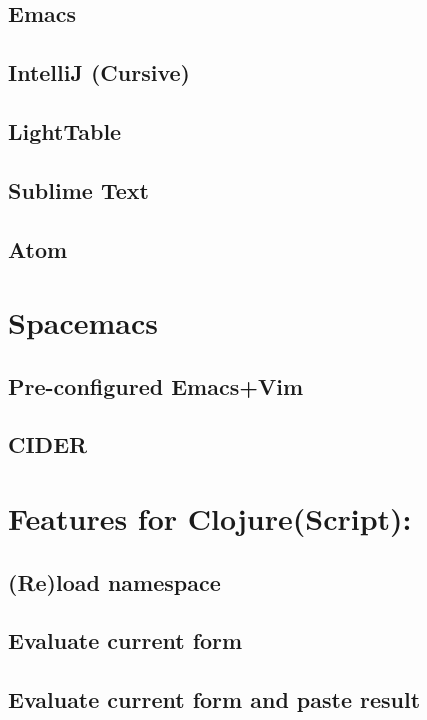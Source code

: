 \documentclass[11pt]{article}
\begin{document}
\subsection{\textbf{Emacs}}
\label{sec:orgheadline23}
\subsection{\textbf{IntelliJ (Cursive)}}
\label{sec:orgheadline24}
\subsection{LightTable}
\label{sec:orgheadline25}
\subsection{Sublime Text}
\label{sec:orgheadline26}
\subsection{Atom}
\label{sec:orgheadline27}

\section{Spacemacs}
\label{sec:orgheadline31}
\subsection{Pre-configured Emacs+Vim}
\label{sec:orgheadline29}
\subsection{CIDER}
\label{sec:orgheadline30}

\section{Features for Clojure(Script):}
\label{sec:orgheadline38}
\subsection{(Re)load namespace}
\label{sec:orgheadline32}
\subsection{Evaluate current form}
\label{sec:orgheadline33}
\subsection{Evaluate current form and paste result}
\label{sec:orgheadline34}
\end{document}
